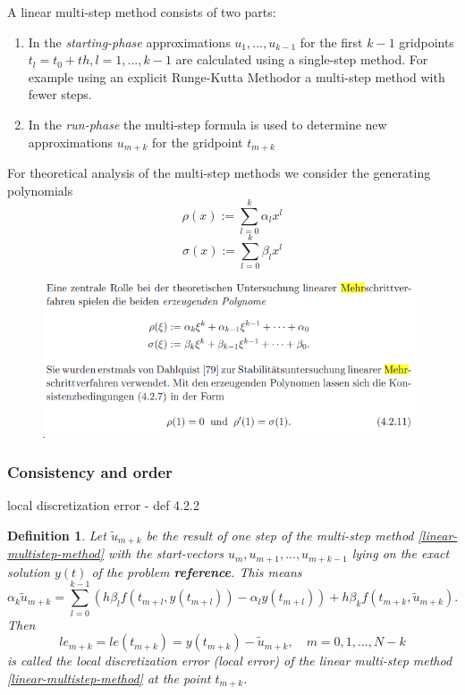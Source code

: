 \documentclass[11pt,titlepage]{article}
\newtheorem{definition}{Definition}
\begin{document}
			A linear multi-step method consists of two parts:
			\begin{enumerate}
				\item In the \emph{starting-phase} approximations $u_1,...,u_{k-1}$ for the first $k-1$ gridpoints $t_l = t_0+th, l=1,...,k-1$ are calculated using a single-step method. For example using an explicit Runge-Kutta Methodor a multi-step method with fewer steps.
				
				\item  In the \emph{run-phase} the multi-step formula is used to determine new approximations $u_{m+k}$ for the gridpoint $t_{m+k}$
			\end{enumerate}
			
			For theoretical analysis of the multi-step methods we consider the generating polynomials
			\begin{equation}
				\rho(x) := \sum_{l=0}^{k} \alpha_l x^l
			\end{equation}
			\begin{equation}
				\sigma(x) := \sum_{l=0}^{k} \beta_l x^l
			\end{equation}
		
			\begin{figure}[H]
				\centering
				\includegraphics[width=0.7\linewidth]{screenshot013}
				\caption{}
				\label{fig:screenshot013}
			\end{figure}
			
			
			\subsubsection{Consistency and order}
				local discretization error - def 4.2.2
				\begin{definition}
					Let $\tilde{u}_{m+k}$ be the result of one step of the multi-step method \ref{linear-multistep-method} with the start-vectors $u_m, u_{m+1}, ..., u_{m+k-1}$ lying on the exact solution $y(t)$ of the problem \textbf{reference}. This means
					\begin{displaymath}
						\alpha_k \tilde{u}_{m+k} = \sum_{l=0}^{k-1} \left( h \beta_l f(t_{m+l}, y(t_{m+l})) - \alpha_l y(t_{m+l}) \right) + h \beta_k f(t_{m+k}, \tilde{u}_{m+k}) .
					\end{displaymath}
					Then
					\begin{displaymath}
						le_{m+k} = le(t_{m+k}) = y(t_{m+k}) - \tilde{u}_{m+k}, \quad m=0,1,...,N-k
					\end{displaymath}
					 is called the \emph{local discretization error} (local error) of the linear multi-step method \ref{linear-multistep-method} at the point $t_{m+k}$.
				\end{definition}
				
\end{document}

